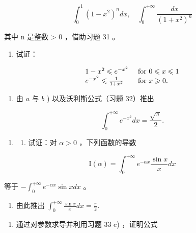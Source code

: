 \[
\int_ {0} ^ {1} \left(1 - x ^ {2}\right) ^ {n} d x, \quad \int_ {0} ^ {+ \infty} \frac {d x}{\left(1 + x ^ {2}\right) ^ {n}}
\]

其中 n 是整数 \textgreater{} 0 ，借助习题 31 。

\begin{enumerate}
\def\labelenumi{\alph{enumi})}
\setcounter{enumi}{1}
\tightlist
\item
  试证：
\end{enumerate}

\[
\begin{array}{l l} 1 - x ^ {2} \leqslant e ^ {- x ^ {2}} & \text { for } 0 \leqslant x \leqslant 1 \\ e ^ {- x ^ {2}} \leqslant \frac {1}{1 + x ^ {2}} & \text { for } x \geqslant 0. \end{array}
\]

\begin{enumerate}
\def\labelenumi{\alph{enumi})}
\setcounter{enumi}{2}
\tightlist
\item
  由 \(a\) 与 \(b\) ) 以及沃利斯公式（习题 32）推出
\end{enumerate}

\[
\int_ {0} ^ {+ \infty} e ^ {- x ^ {2}} d x = \frac {\sqrt {\pi}}{2}.
\]

\begin{enumerate}
\def\labelenumi{\arabic{enumi})}
\setcounter{enumi}{33}
\tightlist
\item
  \begin{enumerate}
  \def\labelenumii{\alph{enumii})}
  \tightlist
  \item
    试证：对 \(\alpha > 0\) ，下列函数的导数
  \end{enumerate}
\end{enumerate}

\[
\mathrm{I} (\alpha) = \int_ {0} ^ {+ \infty} e ^ {- \alpha x} \frac {\sin x}{x} d x
\]

等于 \(-\int_{0}^{+\infty}e^{-\alpha x}\sin x dx\) 。

\begin{enumerate}
\def\labelenumi{\alph{enumi})}
\setcounter{enumi}{1}
\tightlist
\item
  由此推出 \(\int_0^{+\infty}\frac{\sin x}{x} dx = \frac{\pi}{2}.\)
\end{enumerate}

\begin{enumerate}
\def\labelenumi{\arabic{enumi})}
\setcounter{enumi}{34}
\tightlist
\item
  通过对参数求导并利用习题 33 c) ，证明公式
\end{enumerate}

